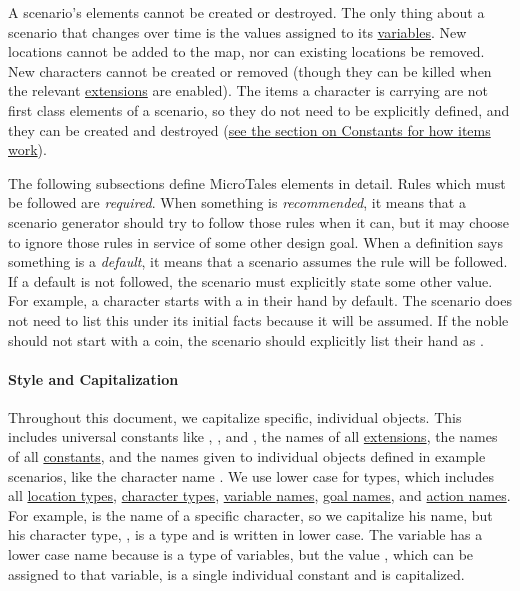 \documentclass{nilreport}
\begin{document}
A scenario's elements cannot be created or destroyed. The only thing about a scenario that changes over time is the values assigned to its \hyperref[sec:variables]{variables}. New locations cannot be added to the map, nor can existing locations be removed. New characters cannot be created or removed (though they can be killed when the relevant \hyperref[sec:extensions]{extensions} are enabled). The items a character is carrying are not first class elements of a scenario, so they do not need to be explicitly defined, and they can be created and destroyed (\hyperref[sec:constants]{see the section on Constants for how items work}).

The following subsections define MicroTales elements in detail. Rules which must be followed are {\em required}. When something is {\em recommended}, it means that a scenario generator should try to follow those rules when it can, but it may choose to ignore those rules in service of some other design goal. When a definition says something is a {\em default}, it means that a scenario assumes the rule will be followed. If a default is not followed, the scenario must explicitly state some other value. For example, a  character starts with a  in their  hand by default. The scenario does not need to list this under its initial facts because it will be assumed. If the noble should not start with a coin, the scenario should explicitly list their  hand as \None.

\paragraph{Style and Capitalization}
Throughout this document, we capitalize specific, individual objects. This includes universal constants like , , and \None, the names of all \hyperref[sec:extensions]{extensions}, the names of all \hyperref[sec:constants]{constants}, and the names given to individual objects defined in example scenarios, like the character name . We use lower case for types, which includes all \hyperref[sec:locations]{location types}, \hyperref[sec:characters]{character types}, \hyperref[sec:variables]{variable names}, \hyperref[sec:goals]{goal names}, and \hyperref[sec:actions]{action names}. For example,  is the name of a specific character, so we capitalize his name, but his character type, , is a type and is written in lower case. The variable  has a lower case name because  is a type of variables, but the value , which can be assigned to that variable, is a single individual constant and is capitalized.
\end{document}
